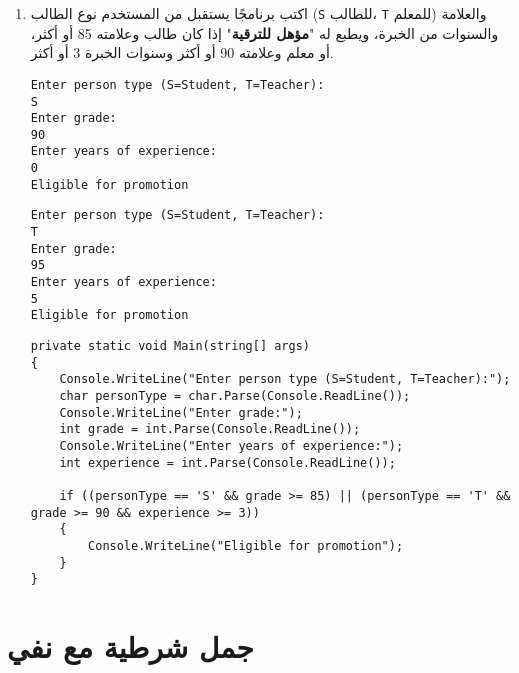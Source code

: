 \documentclass[12pt]{article}
\begin{document}
\begin{enumerate}[itemsep=3em]
\begin{enumerate}[itemsep=3em]
\begin{enumerate}[itemsep=3em]
\begin{enumerate}[itemsep=3em]
\begin{enumerate}[itemsep=3em]
\begin{enumerate}
\item
اكتب برنامجًا يستقبل من المستخدم نوع الطالب (\texttt{S} للطالب، \texttt{T} للمعلم) والعلامة والسنوات من الخبرة، ويطبع له "\textbf{مؤهل للترقية}" إذا كان طالب وعلامته 85 أو أكثر، أو معلم وعلامته 90 أو أكثر وسنوات الخبرة 3 أو أكثر.
\ifdetailed
\begin{example}[1]
\begin{english}
\begin{lstlisting}
Enter person type (S=Student, T=Teacher):
S
Enter grade:
90
Enter years of experience:
0
Eligible for promotion
\end{lstlisting}
\end{english}
\end{example}
\begin{example}[2]
\begin{english}
\begin{lstlisting}
Enter person type (S=Student, T=Teacher):
T
Enter grade:
95
Enter years of experience:
5
Eligible for promotion
\end{lstlisting}
\end{english}
\end{example}

\ifwithsols
\begin{solution}
\begin{english}
\begin{lstlisting}
private static void Main(string[] args)
{
    Console.WriteLine("Enter person type (S=Student, T=Teacher):");
    char personType = char.Parse(Console.ReadLine());
    Console.WriteLine("Enter grade:");
    int grade = int.Parse(Console.ReadLine());
    Console.WriteLine("Enter years of experience:");
    int experience = int.Parse(Console.ReadLine());

    if ((personType == 'S' && grade >= 85) || (personType == 'T' && grade >= 90 && experience >= 3))
    {
        Console.WriteLine("Eligible for promotion");
    }
}
\end{lstlisting}
\end{english}
\end{solution}
\clearpage
\fi
\fi

\end{enumerate}

\section{جمل شرطية مع نفي}

\ifdetailed
\begin{enumerate}[itemsep=3em]
\else
\begin{enumerate}
\fi


\end{enumerate}
\end{enumerate}
\end{enumerate}
\end{enumerate}
\end{enumerate}
\end{enumerate}
\end{enumerate}
\end{document}
